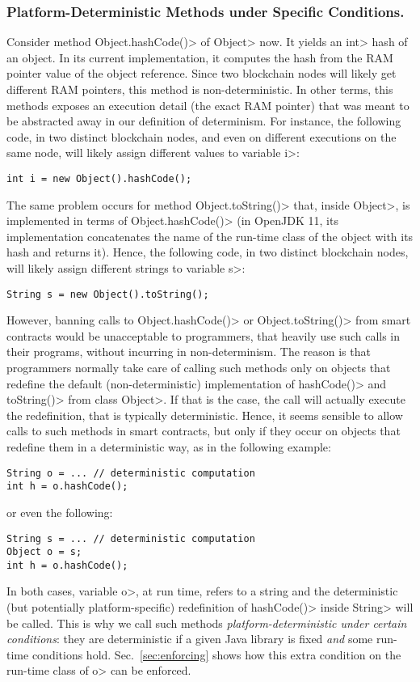\subsubsection*{Platform-Deterministic Methods under Specific Conditions.}
Consider method \<Object.hashCode()> of \<Object> now. It yields an \<int>
hash of an object. In its current implementation, it computes the hash from the
RAM pointer value of the object reference.
Since two blockchain nodes will likely get different RAM pointers,
this method is non-deterministic.
In other terms, this methods exposes an execution detail (the exact RAM pointer)
that was meant to be abstracted away in our definition of determinism.
For instance, the following code, in two distinct blockchain nodes,
and even on different executions on the same node,
will likely assign different values to variable \<i>:
%
\begin{verbatim}
int i = new Object().hashCode();
\end{verbatim}
%
The same problem occurs for method \<Object.toString()> that, inside
\<Object>, is implemented in terms of \<Object.hashCode()> (in OpenJDK 11, its
implementation concatenates
the name of the run-time class of the object with its hash and returns it).
Hence, the following code, in two distinct blockchain nodes,
will likely assign different strings to variable \<s>:
%
\begin{verbatim}
String s = new Object().toString();
\end{verbatim}
%
However, banning calls to \<Object.hashCode()> or \<Object.toString()>
from smart contracts would be unacceptable to programmers, that
heavily use such calls in their programs, without incurring in
non-determinism. The reason is that programmers normally
take care of calling such methods only on objects that redefine
the default (non-deterministic) implementation of
\<hashCode()> and \<toString()> from class \<Object>.
If that is the case, the call will actually
execute the redefinition, that is typically deterministic. Hence, it seems sensible
to allow calls to such methods in smart contracts, but only if they occur
on objects that redefine them in a deterministic way, as in the following example:
%
\begin{verbatim}
String o = ... // deterministic computation
int h = o.hashCode();
\end{verbatim}
%
or even the following:
%
\begin{verbatim}
String s = ... // deterministic computation
Object o = s;
int h = o.hashCode();
\end{verbatim}
%
In both cases, variable \<o>, at run time,
refers to a string and the deterministic (but potentially platform-specific)
redefinition of \<hashCode()> inside \<String> will be called.
This is why we call such methods \emph{platform-deterministic under certain conditions}:
they are deterministic if a given Java library is fixed \emph{and} some run-time conditions hold.
Sec.~\ref{sec:enforcing} shows how this extra condition on the run-time class of
\<o> can be enforced.

